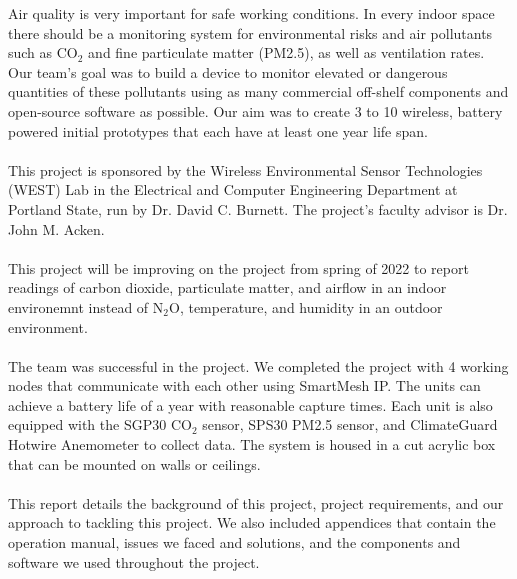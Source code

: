 Air quality is very important for safe working conditions. In every indoor space there should be a monitoring system for environmental risks and air pollutants such as CO$_2$ and fine particulate matter (PM2.5), as well as ventilation rates. Our team’s goal was to build a device to monitor elevated or dangerous quantities of these pollutants using as many commercial off-shelf components and open-source software as possible. Our aim was to create 3 to 10 wireless, battery powered initial prototypes that each have at least one year life span.\\
\\
This project is sponsored by the Wireless Environmental Sensor Technologies (WEST) Lab in the Electrical and Computer Engineering Department at Portland State, run by Dr. David C. Burnett. The project’s faculty advisor is Dr. John M. Acken.\\
\\
This project will be improving on the project from spring of 2022\cite{leon2023networked} to report readings of carbon dioxide, particulate matter, and airflow in an indoor environemnt instead of N$_2$O, temperature, and humidity in an outdoor environment.\\
\\
The team was successful in the project. We completed the project with 4 working nodes that communicate with each other using SmartMesh IP. The units can achieve a battery life of a year with reasonable capture times. Each unit is also equipped with the SGP30 CO$_2$ sensor, SPS30 PM2.5 sensor, and ClimateGuard Hotwire Anemometer to collect data. The system is housed in a cut acrylic box that can be mounted on walls or ceilings.\\
\\
This report details the background of this project, project requirements, and our approach to tackling this project. We also included appendices that contain the operation manual, issues we faced and solutions, and the components and software we used throughout the project.
